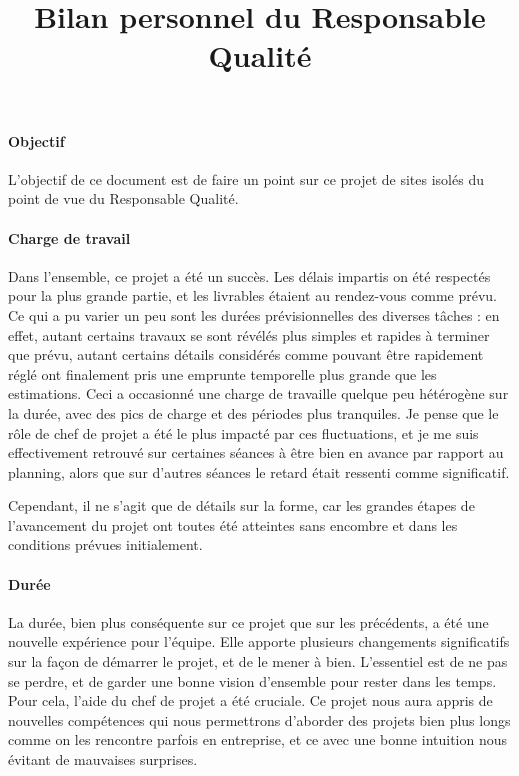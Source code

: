 \documentclass[a4paper]{article}
\begin{document}
\title{Bilan personnel du Responsable Qualité}
\maketitle

\paragraph{Objectif}

L'objectif de ce document est de faire un point sur ce projet de sites isolés du point de vue du Responsable Qualité.

\paragraph{Charge de travail}

Dans l'ensemble, ce projet a été un succès. Les délais impartis on été respectés pour la plus grande partie, et les livrables étaient au rendez-vous comme prévu. Ce qui a pu varier un peu sont les durées prévisionnelles des diverses tâches : en effet, autant certains travaux se sont révélés plus simples et rapides à terminer que prévu, autant certains détails considérés comme pouvant être rapidement réglé ont finalement pris une emprunte temporelle plus grande que les estimations. Ceci a occasionné une charge de travaille quelque peu hétérogène sur la durée, avec des pics de charge et des périodes plus tranquiles. Je pense que le rôle de chef de projet a été le plus impacté par ces fluctuations, et je me suis effectivement retrouvé sur certaines séances à être bien en avance par rapport au planning, alors que sur d'autres séances le retard était ressenti comme significatif.

Cependant, il ne s'agit que de détails sur la forme, car les grandes étapes de l'avancement du projet ont toutes été atteintes sans encombre et dans les conditions prévues initialement.

\paragraph{Durée}

La durée, bien plus conséquente sur ce projet que sur les précédents, a été une nouvelle expérience pour l'équipe. Elle apporte plusieurs changements significatifs sur la façon de démarrer le projet, et de le mener à bien. L'essentiel est de ne pas se perdre, et de garder une bonne vision d'ensemble pour rester dans les temps. Pour cela, l'aide du chef de projet a été cruciale. Ce projet nous aura appris de nouvelles compétences qui nous permettrons d'aborder des projets bien plus longs comme on les rencontre parfois en entreprise, et ce avec une bonne intuition nous évitant de mauvaises surprises.
\end{document}
